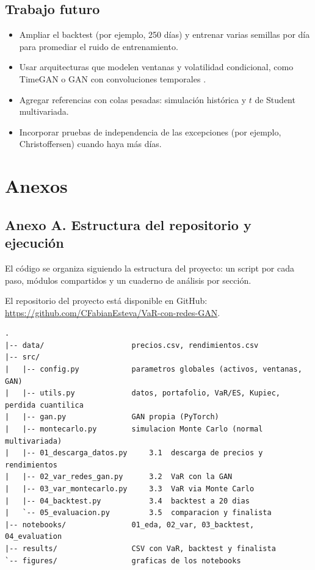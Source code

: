 \documentclass[12pt,letterpaper]{article}
\begin{document}
\subsection*{Trabajo futuro}

\begin{itemize}[nosep]
  \item Ampliar el backtest (por ejemplo, 250 días) y entrenar varias semillas por día para promediar el ruido de entrenamiento.
  \item Usar arquitecturas que modelen ventanas y volatilidad condicional, como TimeGAN o GAN con convoluciones temporales \cite{takahashi2019, yoon2019}.
  \item Agregar referencias con colas pesadas: simulación histórica y $t$ de Student multivariada.
  \item Incorporar pruebas de independencia de las excepciones (por ejemplo, Christoffersen) cuando haya más días.
\end{itemize}

\clearpage
\section*{Anexos}

\subsection*{Anexo A. Estructura del repositorio y ejecución}

El código se organiza siguiendo la estructura del proyecto: un script por cada paso, módulos compartidos y un cuaderno de análisis por sección.

El repositorio del proyecto está disponible en GitHub: \url{https://github.com/CFabianEsteva/VaR-con-redes-GAN}.

\begin{lstlisting}[language={}, numbers=none, basicstyle=\ttfamily\footnotesize]
.
|-- data/                    precios.csv, rendimientos.csv
|-- src/
|   |-- config.py            parametros globales (activos, ventanas, GAN)
|   |-- utils.py             datos, portafolio, VaR/ES, Kupiec, perdida cuantilica
|   |-- gan.py               GAN propia (PyTorch)
|   |-- montecarlo.py        simulacion Monte Carlo (normal multivariada)
|   |-- 01_descarga_datos.py     3.1  descarga de precios y rendimientos
|   |-- 02_var_redes_gan.py      3.2  VaR con la GAN
|   |-- 03_var_montecarlo.py     3.3  VaR via Monte Carlo
|   |-- 04_backtest.py           3.4  backtest a 20 dias
|   `-- 05_evaluacion.py         3.5  comparacion y finalista
|-- notebooks/               01_eda, 02_var, 03_backtest, 04_evaluation
|-- results/                 CSV con VaR, backtest y finalista
`-- figures/                 graficas de los notebooks
\end{lstlisting}
\end{document}

